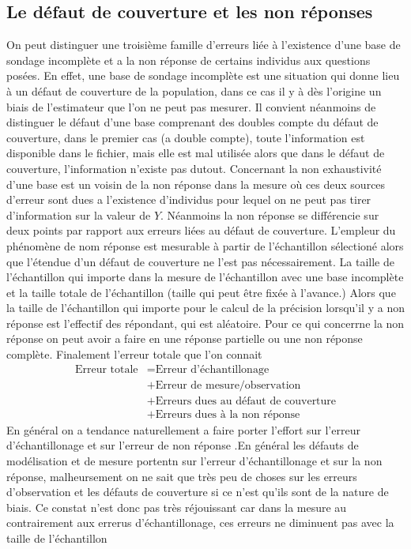 \documentclass[a4paper]{article}
\begin{document}
\subsection{Le défaut de couverture et les non réponses}
On peut distinguer une troisième famille d'erreurs liée à l'existence d'une base de sondage incomplète et a la non réponse de certains individus aux
questions posées. En effet, une base de sondage incomplète est une situation qui donne lieu à un défaut de couverture de la population, dans ce cas il
y à dès l'origine un biais de l'estimateur que l'on ne peut pas mesurer. Il convient néanmoins de distinguer le défaut d'une base comprenant des
doubles compte du défaut de couverture, dans le premier cas (a double compte), toute l'information est disponible dans le fichier, mais elle est mal
utilisée alors que dans le défaut de couverture, l'information n'existe pas dutout. Concernant la non exhaustivité d'une base est un voisin de la non
réponse dans la mesure où ces deux sources d'erreur sont dues a l'existence d'individus pour lequel on ne peut pas tirer d'information sur la valeur
de $Y$. Néanmoins la non réponse se différencie sur deux points par rapport aux erreurs liées au défaut de couverture. L'empleur du phénomène de nom 
réponse est mesurable à partir de l'échantillon sélectioné alors que l'étendue d'un défaut de couverture ne l'est pas nécessairement. La taille de
l'échantillon qui importe dans la mesure de l'échantillon avec une base incomplète et la taille totale de l'échantillon (taille qui peut être fixée à
l'avance.) Alors que la taille de l'échantillon qui importe pour le calcul de la précision lorsqu'il y a non réponse est l'effectif des répondant, qui
est aléatoire.
Pour ce qui concerrne la non réponse on peut avoir a faire en une réponse partielle ou une non réponse complète. Finalement l'erreur totale que l'on
connait 
\begin{equation*}
\begin{split}
    \text{Erreur totale} &= \boxed{\text{Erreur d'échantillonage}} \\
                         &+ \text{Erreur de mesure/observation}\\
                         &+ \text{Erreurs dues au défaut de couverture} \\
                         &+ \boxed{\text{Erreurs dues à la non réponse}} 
\end{split}
\end{equation*}
En général on a tendance naturellement a faire porter l'effort sur l'erreur d'échantillonage et sur l'erreur de non réponse .En général les défauts de
modélisation et de mesure portentn sur l'erreur d'échantillonage et sur la non réponse, malheursement on ne sait que très peu de choses sur les
erreurs d'observation et les défauts de couverture si ce n'est qu'ils sont de la nature de biais. Ce constat n'est donc pas très réjouissant car dans
la mesure au contrairement aux errerus d'échantillonage, ces erreurs ne diminuent pas avec la taille de l'échantillon
\end{document}
